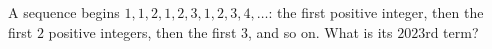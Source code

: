 A sequence begins $1,1,2,1,2,3,1,2,3,4,\dots$: the first positive integer, then the first $2$ positive integers, then the first $3$, and so on. What is its $2023$rd term?
